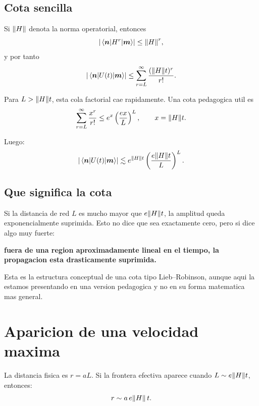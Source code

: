 \subsection{Cota sencilla}
Si \(\norm{H}\) denota la norma operatorial, entonces
\begin{equation}
\abs{\mel{\bm{n}}{H^r}{\bm{m}}}\le \norm{H}^r,
\end{equation}
y por tanto
\begin{equation}
\abs{\mel{\bm{n}}{U(t)}{\bm{m}}}
\le
\sum_{r=L}^{\infty}\frac{(\norm{H}t)^r}{r!}.
\label{c19:eq:tailbound}
\end{equation}

Para \(L>\norm{H}t\), esta cola factorial cae rapidamente. Una cota pedagogica util es
\begin{equation}
\sum_{r=L}^{\infty}\frac{x^r}{r!}
\le
e^x\left(\frac{ex}{L}\right)^L,
\qquad x=\norm{H}t.
\label{c19:eq:factorialbound}
\end{equation}

Luego:
\begin{equation}
\abs{\mel{\bm{n}}{U(t)}{\bm{m}}}
\lesssim
e^{\norm{H}t}\left(\frac{e\norm{H}t}{L}\right)^L.
\label{c19:eq:finalbound}
\end{equation}

\subsection{Que significa la cota}
Si la distancia de red \(L\) es mucho mayor que \(e\norm{H}t\), la amplitud queda exponencialmente suprimida. Esto no dice que sea exactamente cero, pero si dice algo muy fuerte:
\begin{displayquote}
\textbf{fuera de una region aproximadamente lineal en el tiempo, la propagacion esta drasticamente suprimida.}
\end{displayquote}

Esta es la estructura conceptual de una cota tipo Lieb--Robinson, aunque aqui la estamos presentando en una version pedagogica y no en su forma matematica mas general.

\section{Aparicion de una velocidad maxima}
La distancia fisica es \(r=aL\). Si la frontera efectiva aparece cuando \(L\sim e\norm{H}t\), entonces:
\begin{equation}
r \sim a\,e\norm{H}\, t.
\end{equation}

